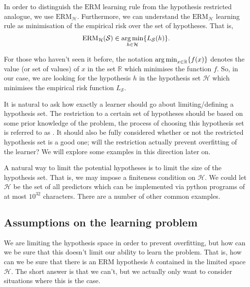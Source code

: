 In order to distinguish the $ \mathrm{ERM} $ learning rule from the hypothesis restricted analogue, we use $ \mathrm{ERM}_{\mathcal{H}} $. Furthermore, we can understand the $ \mathrm{ERM}_{\mathcal{H}} $ learning rule as minimisation of the empirical risk over the set of hypotheses. That is,
\begin{align*}
	\mathrm{ERM}_{\mathcal{H}}( \mathcal{S} ) \in \operatorname*{arg\,min}_{h \in \mathcal{H}}\{ L_{\mathcal{S}}( h ) \}.
\end{align*}

\begin{notation}
	For those who haven't seen it before, the notation $ \operatorname*{arg\,min}_{x \in \mathbb{R}}\{ f ( x ) \} $ denotes the value (or set of values) of $ x $ in the set $ \mathbb{R} $ which minimises the function $ f $. So, in our case, we are looking for the hypothesis $ h $ in the hypothesis set $ \mathcal{H} $ which minimises the empirical risk function $ L_{\mathcal{S}} $.
\end{notation}

It is natural to ask how exactly a learner should go about limiting/defining a hypothesis set. The restriction to a certain set of hypotheses should be based on some prior knowledge of the problem, the process of choosing this hypothesis set is referred to as . It should also be fully considered whether or not the restricted hypothesis set is a good one; will the restriction actually prevent overfitting of the learner? We will explore some examples in this direction later on.

\begin{example}
	A natural way to limit the potential hypotheses is to limit the size of the hypothesis set. That is, we may impose a finiteness condition on $ \mathcal{H} $. We could let $ \mathcal{H} $ be the set of all predictors which can be implemented via python programs of at most $ 10^{32} $ characters. There are a number of other common examples.
\end{example}

\subsection{Assumptions on the learning problem}
We are limiting the hypothesis space in order to prevent overfitting, but how can we be sure that this doesn't limit our ability to learn the problem. That is, how can we be sure that there is an $ \mathrm{ERM} $ hypothesis $ h $ contained in the limited space $ \mathcal{H} $. The short answer is that we can't, but we actually only want to consider situations where this is the case.

